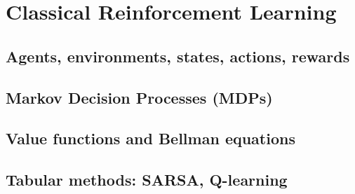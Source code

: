 ﻿\chapter{Classical Reinforcement Learning}
\section{Agents, environments, states, actions, rewards}

\section{Markov Decision Processes (MDPs)}

\section{Value functions and Bellman equations}

\section{Tabular methods: SARSA, Q-learning}


